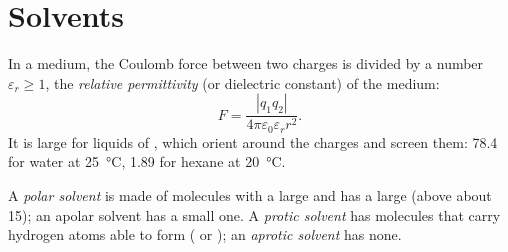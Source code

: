 \section{Solvents}

\begin{definition}\label{def:b1:intermolecular-forces-solvents:permittivity}
In a medium, the Coulomb force between two charges is divided by a number
$\varepsilon_r \ge 1$, the \emph{relative permittivity}
(or dielectric constant) of the medium:
\[
  F = \frac{|q_1 q_2|}{4\pi\varepsilon_0\varepsilon_r r^2} .
\]
It is large for liquids of , which orient around the
charges and screen them: \num{78.4} for water at \qty{25}{\celsius},
\num{1.89} for hexane at \qty{20}{\celsius}.
\end{definition}

\begin{definition}\label{def:b1:intermolecular-forces-solvents:solvent-classes}
A \emph{polar solvent} is made of molecules with a
large  and has a large  (above about
15); an apolar solvent has a small one. A \emph{protic
solvent} has molecules that carry hydrogen atoms
able to form  ( or ); an \emph{aprotic
solvent} has none.
\end{definition}

